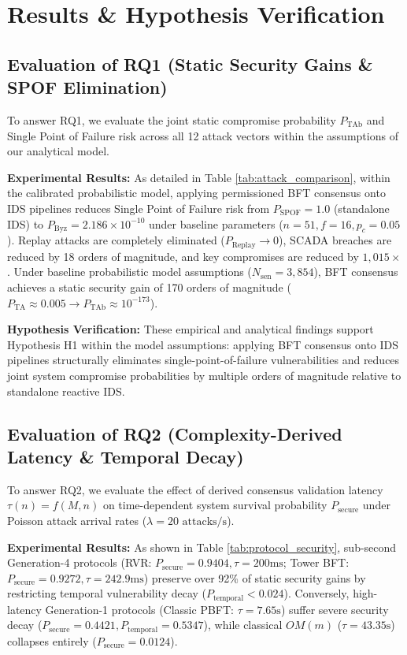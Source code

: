 \documentclass[10pt,twocolumn,journal]{IEEEtran}
\begin{document}
\section{Results & Hypothesis Verification}
\label{sec:results}

\subsection{Evaluation of RQ1 (Static Security Gains & SPOF Elimination)}
To answer RQ1, we evaluate the joint static compromise probability $P_{\text{TAb}}$ and Single Point of Failure risk across all 12 attack vectors within the assumptions of our analytical model.

\noindent\textbf{Experimental Results:} As detailed in Table \ref{tab:attack_comparison}, within the calibrated probabilistic model, applying permissioned BFT consensus onto IDS pipelines reduces Single Point of Failure risk from $P_{\text{SPOF}} = 1.0$ (standalone IDS) to $P_{\text{Byz}} = 2.186 \times 10^{-10}$ under baseline parameters ($n=51, f=16, p_c=0.05$). Replay attacks are completely eliminated ($P_{\text{Replay}} \to 0$), SCADA breaches are reduced by 18 orders of magnitude, and key compromises are reduced by $1,015\times$. Under baseline probabilistic model assumptions ($N_{\text{sen}} = 3,854$), BFT consensus achieves a static security gain of 170 orders of magnitude ($P_{\text{TA}} \approx 0.005 \to P_{\text{TAb}} \approx 10^{-173}$).

\noindent\textbf{Hypothesis Verification:} These empirical and analytical findings support Hypothesis H1 within the model assumptions: applying BFT consensus onto IDS pipelines structurally eliminates single-point-of-failure vulnerabilities and reduces joint system compromise probabilities by multiple orders of magnitude relative to standalone reactive IDS.

\subsection{Evaluation of RQ2 (Complexity-Derived Latency & Temporal Decay)}
To answer RQ2, we evaluate the effect of derived consensus validation latency $\tau(n) = f(M,n)$ on time-dependent system survival probability $P_{\text{secure}}$ under Poisson attack arrival rates ($\lambda = 20\text{ attacks/s}$).

\noindent\textbf{Experimental Results:} As shown in Table \ref{tab:protocol_security}, sub-second Generation-4 protocols (RVR: $P_{\text{secure}} = 0.9404, \tau = 200\text{ms}$; Tower BFT: $P_{\text{secure}} = 0.9272, \tau = 242.9\text{ms}$) preserve over 92\% of static security gains by restricting temporal vulnerability decay ($P_{\text{temporal}} < 0.024$). Conversely, high-latency Generation-1 protocols (Classic PBFT: $\tau = 7.65\text{s}$) suffer severe security decay ($P_{\text{secure}} = 0.4421, P_{\text{temporal}} = 0.5347$), while classical $OM(m)$ ($\tau = 43.35\text{s}$) collapses entirely ($P_{\text{secure}} = 0.0124$).
\end{document}
